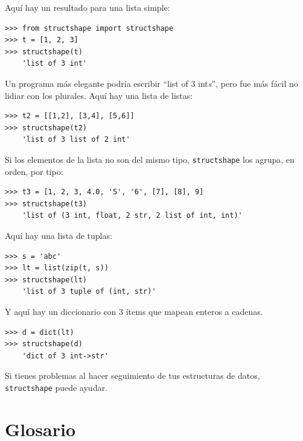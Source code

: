 \documentclass[10pt]{book}
\begin{document}
Aquí hay un resultado para una lista simple:

\begin{verbatim}
>>> from structshape import structshape
>>> t = [1, 2, 3]
>>> structshape(t)
    'list of 3 int'
\end{verbatim}
%
Un programa más elegante podría escribir ``list of 3 int{\em s}'', pero
fue más fácil no lidiar con los plurales.  Aquí hay una lista de listas:

\begin{verbatim}
>>> t2 = [[1,2], [3,4], [5,6]]
>>> structshape(t2)
    'list of 3 list of 2 int'
\end{verbatim}
%
Si los elementos de la lista no son del mismo tipo,
{\tt structshape} los agrupa, en orden, por tipo:

\begin{verbatim}
>>> t3 = [1, 2, 3, 4.0, '5', '6', [7], [8], 9]
>>> structshape(t3)
    'list of (3 int, float, 2 str, 2 list of int, int)'
\end{verbatim}
%
Aquí hay una lista de tuplas:

\begin{verbatim}
>>> s = 'abc'
>>> lt = list(zip(t, s))
>>> structshape(lt)
    'list of 3 tuple of (int, str)'
\end{verbatim}
%
Y aquí hay un diccionario con 3 ítems que mapean enteros a cadenas.

\begin{verbatim}
>>> d = dict(lt)
>>> structshape(d)
    'dict of 3 int->str'
\end{verbatim}
%
Si tienes problemas al hacer seguimiento de tus estructuras de datos,
{\tt structshape} puede ayudar.


\section{Glosario}
\end{document}
